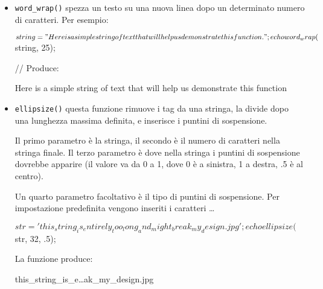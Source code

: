 \begin{itemize}

\item \verb|word_wrap()| spezza un testo su una nuova linea dopo un determinato numero di caratteri. Per esempio:

\begin{code}
$string = "Here is a simple string of text that will help us demonstrate this function.";

echo word_wrap($string, 25);

// Produce:

Here is a simple string
of text that will help
us demonstrate this
function
\end{code}

\item \verb|ellipsize()| questa funzione rimuove i tag da una stringa, la divide dopo una lunghezza massima definita, e inserisce i puntini di sospensione.

Il primo parametro è la stringa, il secondo è il numero di caratteri nella stringa finale. Il terzo parametro è dove nella stringa i puntini di sospensione dovrebbe apparire (il valore va da 0 a 1, dove 0 è a sinistra, 1 a destra, .5 è al centro).

Un quarto parametro facoltativo è il tipo di puntini di sospensione. Per impostazione predefinita vengono inseriti i caratteri \dots

\begin{code}
$str = 'this_string_is_entirely_too_long_and_might_break_my_design.jpg';

echo ellipsize($str, 32, .5);
\end{code}

La funzione produce:

\begin{code}
this_string_is_e…ak_my_design.jpg
\end{code}

\end{itemize}